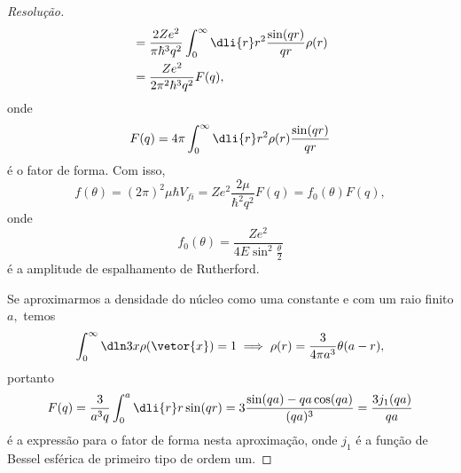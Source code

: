 \begin{proof}[Resolução]
\begin{align*}
             &= \frac{2Ze^2}{\pi \hbar^3 q^2} \int_{0}^\infty \dli{r} r^2 \frac{\sin(qr)}{qr} \rho(r)\\
             &= \frac{Ze^2}{2\pi^2 \hbar^3 q^2} F(q),
   \end{align*}
   onde
   \begin{equation*}
      F(q) = 4\pi \int_0^\infty \dli{r} r^2 \rho(r) \frac{\sin(qr)}{qr}
   \end{equation*}
   é o fator de forma. Com isso,
   \begin{equation*}
      f(\theta) = (2\pi)^2 \mu \hbar V_{fi} = Ze^2\frac{2\mu}{\hbar^2 q^2} F(q) = f_0(\theta) F(q),
   \end{equation*}
   onde
   \begin{equation*}
      f_0(\theta) = \frac{Ze^2}{4E \sin^2\frac{\theta}2}
   \end{equation*}
   é a amplitude de espalhamento de Rutherford.

   Se aproximarmos a densidade do núcleo como uma constante e com um raio finito \(a,\) temos
   \begin{equation*}
      \int_{0}^\infty \dln3x \rho(\vetor{x}) = 1 \implies \rho(r) = \frac{3}{4\pi a^3}\theta(a - r),
   \end{equation*}
   portanto 
   \begin{equation*}
      F(q) = \frac{3}{a^3q} \int_0^{a} \dli{r} r \sin(qr) = 3 \frac{\sin(q a) - qa \cos(qa)}{(qa)^3} = \frac{3j_1(qa)}{qa}
   \end{equation*}
   é a expressão para o fator de forma nesta aproximação, onde \(j_1\) é a função de Bessel esférica de primeiro tipo de ordem um.
\end{proof}
